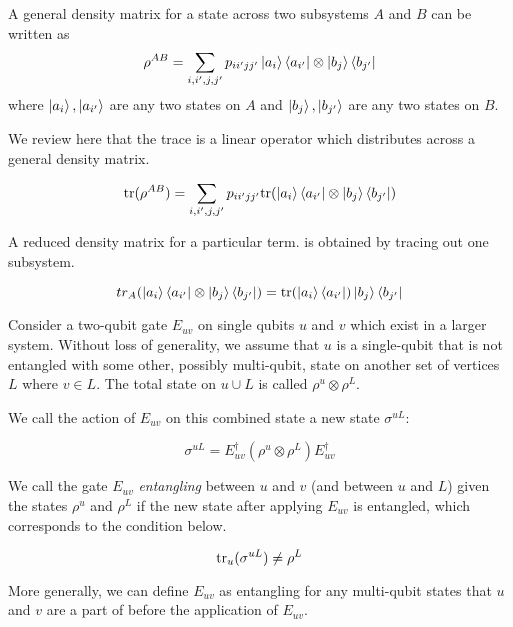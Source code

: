 A general density matrix for a state across two subsystems $A$ and $B$ can be
written as
\begin{equation}
\rho^{AB} = \sum_{i,i',j,j'} p_{ii'jj'} \left\vert{a_i}\right\rangle\left\langle{a_{i'}}\right\vert \otimes \left\vert{b_j}\right\rangle\left\langle{b_{j'}}\right\vert
\end{equation}
where $\left\vert{a_i}\right\rangle,\left\vert{a_{i'}}\right\rangle$ are any two states on $A$ and
$\left\vert{b_j}\right\rangle,\left\vert{b_{j'}}\right\rangle$ are any two states on $B$.

We review here that the trace is a linear operator which distributes across
a general density matrix.

\begin{equation}
\text{tr}(\rho^{AB}) = \sum_{i,i',j,j'} p_{ii'jj'} \text{tr} (\left\vert{a_i}\right\rangle\left\langle{a_{i'}}\right\vert \otimes \left\vert{b_j}\right\rangle\left\langle{b_{j'}}\right\vert)
\end{equation}

A reduced density matrix for a particular term.
is obtained by tracing out
one subsystem.

\begin{equation}
tr_A(\left\vert{a_i}\right\rangle\left\langle{a_{i'}}\right\vert \otimes \left\vert{b_j}\right\rangle\left\langle{b_{j'}}\right\vert) = \text{tr}(\left\vert{a_i}\right\rangle\left\langle{a_{i'}}\right\vert) \left\vert{b_j}\right\rangle\left\langle{b_{j'}}\right\vert
\end{equation}

Consider a two-qubit gate $E_{uv}$ on single qubits $u$ and $v$ which exist
in a larger system.
Without loss of generality, we assume that $u$ is a single-qubit
that is not entangled with some other, possibly multi-qubit,
state on another set of vertices $L$ where $v \in L$.
The total state on $u \cup L$ is called $\rho^{u}\otimes \rho^{L}$.

We call the action of $E_{uv}$ on this combined state a new state $\sigma^{uL}$:

\begin{equation}
\sigma^{uL} = E^{\dagger}_{uv} (\rho^{u}\otimes \rho^{L}) E^{\dagger}_{uv}
\end{equation}

We call the gate $E_{uv}$ \emph{entangling} between $u$ and $v$
(and between $u$ and $L$) given the states $\rho^{u}$ and $\rho^{L}$ if
the new state after applying $E_{uv}$ is entangled, which corresponds to
the condition below.

\begin{equation}
\text{tr}_{u}( \sigma^{uL} ) \ne \rho^{L}
\end{equation}

More generally, we can define $E_{uv}$ as entangling for any multi-qubit
states that $u$ and $v$ are a part of before the application of $E_{uv}$.

